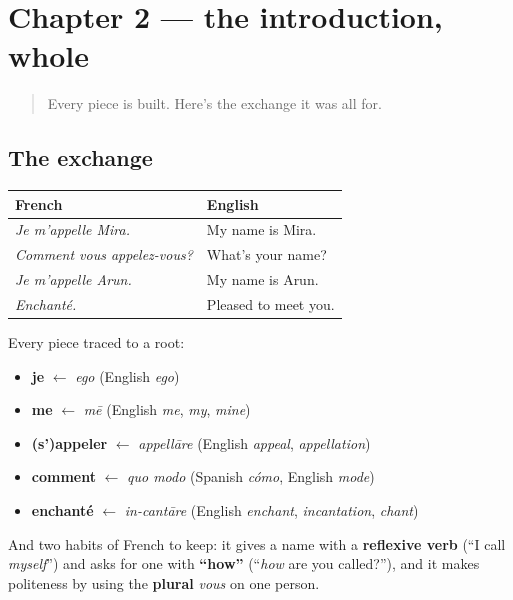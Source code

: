 \section[Practice]{Chapter 2 — the introduction, whole}

\label{lesson:FR-C02-practice}



\begin{quote}
Every piece is built. Here's the exchange it was all for.
\end{quote}

\subsection*{The exchange}
\noindent
\begin{tabularx}{\linewidth}{@{}>{\raggedright\arraybackslash}X>{\raggedright\arraybackslash}X@{}}
\toprule
\textbf{French} & \textbf{English} \\
\midrule
\emph{Je m'appelle Mira.} & My name is Mira. \\
\emph{Comment vous appelez-vous?} & What's your name? \\
\emph{Je m'appelle Arun.} & My name is Arun. \\
\emph{Enchanté.} & Pleased to meet you. \\
\bottomrule
\end{tabularx}

Every piece traced to a root:

\begin{itemize}
\raggedright
  \item \textbf{je} $\leftarrow$ \emph{ego} (English \emph{ego})
  \item \textbf{me} $\leftarrow$ \emph{mē} (English \emph{me}, \emph{my}, \emph{mine})
  \item \textbf{(s')appeler} $\leftarrow$ \emph{appellāre} (English \emph{appeal}, \emph{appellation})
  \item \textbf{comment} $\leftarrow$ \emph{quo modo} (Spanish \emph{cómo}, English \emph{mode})
  \item \textbf{enchanté} $\leftarrow$ \emph{in-cantāre} (English \emph{enchant}, \emph{incantation}, \emph{chant})
\end{itemize}

And two habits of French to keep: it gives a name with a \textbf{reflexive verb} (\textquotedblleft{}I call \emph{myself}\textquotedblright{}) and asks for one with \textbf{\textquotedblleft{}how\textquotedblright{}} (\textquotedblleft{}\emph{how} are you called?\textquotedblright{}), and it makes politeness by using the \textbf{plural} \emph{vous} on one person.

